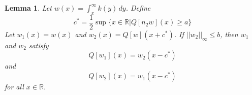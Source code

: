 \documentclass[11pt]{article}
\newtheorem{lem}[thm]{Lemma}
\newtheorem{prop}[thm]{Proposition}
\theoremstyle{definition}
\numberwithin{equation}{section}
\numberwithin{thm}{section}
\renewcommand{\a}{a}
\renewcommand{\b}{b}
\newcommand{\mtwo}{n_2}
\begin{document}
%


\begin{lem} \label{lemmamain}
Let $w(x) = \int_x^\infty k(y) \, dy$. Define
\begin{equation}
c^* = \frac{1}{2} \sup \{ x\in\mathbb R | Q[\mtwo w](x) \geq \a \}
\end{equation}
Let $w_1(x) = w(x)$ and $w_2(x) = Q[w](x+c^*)$. If $|| w_2 ||_\infty \leq \b $, then $w_1$ and $w_2$ satisfy
\begin{equation} \label{lemma1claim1}
Q[w_1](x) = w_2(x-c^*)
\end{equation}
and
\begin{equation}\label{lemma1claim2}
Q[w_2](x) = w_1(x-c^*)
\end{equation}
for all $x \in \mathbb R$.
\end{lem}

%
\end{document}
